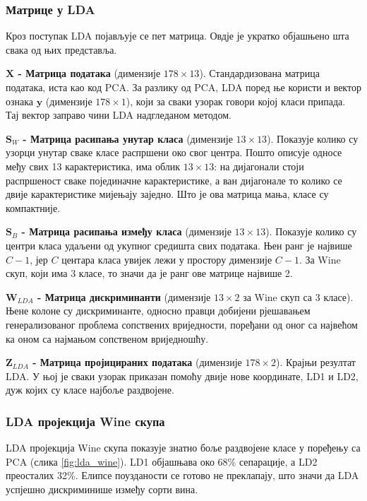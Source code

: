 \documentclass{article}
\begin{document}
	
	\subsubsection{Матрице у LDA}
	
	Кроз поступак LDA појављује се пет матрица. Овдје је укратко објашњено шта свака од њих представља.
	
	\textbf{$\mathbf{X}$ - Матрица података} (димензије $178 \times 13$). Стандардизована матрица података, иста као код PCA. За разлику од PCA, LDA поред ње користи и вектор ознака $\mathbf{y}$ (димензије $178 \times 1$), који за сваки узорак говори којој класи припада. Тај вектор заправо чини LDA надгледаном методом.
	
	\textbf{$\mathbf{S}_W$ - Матрица расипања унутар класа} (димензије $13 \times 13$). Показује колико су узорци унутар сваке класе распршени око свог центра. Пошто описује односе међу свих 13 карактеристика, има облик $13 \times 13$: на дијагонали стоји распршеност сваке појединачне карактеристике, а ван дијагонале то колико се двије карактеристике мијењају заједно. Што је ова матрица мања, класе су компактније.
	
	\textbf{$\mathbf{S}_B$ - Матрица расипања између класа} (димензије $13 \times 13$). Показује колико су центри класа удаљени од укупног средишта свих података. Њен ранг је највише $C-1$, јер $C$ центара класа увијек лежи у простору димензије $C-1$. За Wine скуп, који има 3 класе, то значи да је ранг ове матрице највише 2.
	
	\textbf{$\mathbf{W}_{LDA}$ - Матрица дискриминанти} (димензије $13 \times 2$ за Wine скуп са 3 класе). Њене колоне су дискриминанте, односно правци добијени рјешавањем генерализованог проблема сопствених вриједности, поређани од оног са највећом ка оном са најмањом сопственом вриједношћу.
	
	\textbf{$\mathbf{Z}_{LDA}$ - Матрица пројицираних података} (димензије $178 \times 2$). Крајњи резултат LDA. У њој је сваки узорак приказан помоћу двије нове координате, LD1 и LD2, дуж којих су класе најбоље раздвојене.
	
		
	\subsubsection{LDA пројекција Wine скупа}
	
	LDA пројекција Wine скупа показује знатно боље раздвојене класе у поређењу са PCA (слика \ref{fig:lda_wine}). LD1 објашњава око 68\% сепарације, а LD2 преосталих 32\%. Елипсе поузданости се готово не преклапају, што значи да LDA успјешно дискриминише између сорти вина.
	
\end{document}
